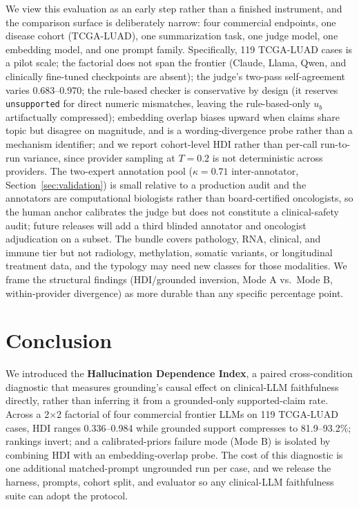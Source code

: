 \documentclass{article}
\theoremstyle{plain}
\begin{document}
We view this evaluation as an early step rather than a finished instrument, and the comparison surface is deliberately narrow: four commercial endpoints, one disease cohort (TCGA-LUAD), one summarization task, one judge model, one embedding model, and one prompt family. Specifically, 119 TCGA-LUAD cases is a pilot scale; the factorial does not span the frontier (Claude, Llama, Qwen, and clinically fine-tuned checkpoints are absent); the judge's two-pass self-agreement varies 0.683--0.970; the rule-based checker is conservative by design (it reserves \texttt{unsupported} for direct numeric mismatches, leaving the rule-based-only $u_b$ artifactually compressed); embedding overlap biases upward when claims share topic but disagree on magnitude, and is a wording-divergence probe rather than a mechanism identifier; and we report cohort-level HDI rather than per-call run-to-run variance, since provider sampling at $T{=}0.2$ is not deterministic across providers. The two-expert annotation pool ($\kappa = 0.71$ inter-annotator, Section~\ref{sec:validation}) is small relative to a production audit and the annotators are computational biologists rather than board-certified oncologists, so the human anchor calibrates the judge but does not constitute a clinical-safety audit; future releases will add a third blinded annotator and oncologist adjudication on a subset. The bundle covers pathology, RNA, clinical, and immune tier but not radiology, methylation, somatic variants, or longitudinal treatment data, and the typology may need new classes for those modalities. We frame the structural findings (HDI/grounded inversion, Mode A vs.\ Mode B, within-provider divergence) as more durable than any specific percentage point.

\section{Conclusion}
\label{sec:conclusion}

We introduced the \textbf{Hallucination Dependence Index}, a paired cross-condition diagnostic that measures grounding's causal effect on clinical-LLM faithfulness directly, rather than inferring it from a grounded-only supported-claim rate. Across a 2$\times$2 factorial of four commercial frontier LLMs on 119 TCGA-LUAD cases, HDI ranges 0.336--0.984 while grounded support compresses to 81.9--93.2\%; rankings invert; and a calibrated-priors failure mode (Mode B) is isolated by combining HDI with an embedding-overlap probe. The cost of this diagnostic is one additional matched-prompt ungrounded run per case, and we release the harness, prompts, cohort split, and evaluator so any clinical-LLM faithfulness suite can adopt the protocol.
\end{document}
